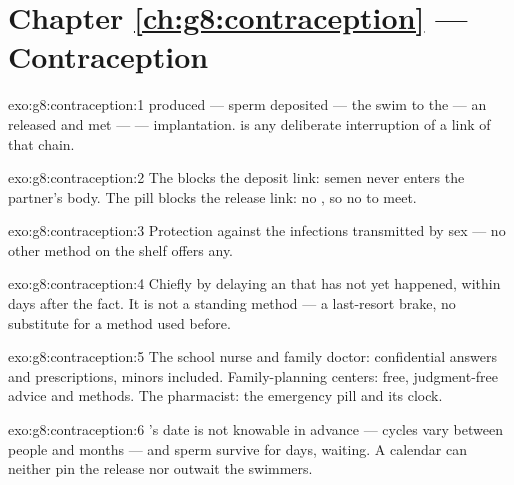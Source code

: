 \section*{Chapter \ref{ch:g8:contraception} --- Contraception}

\begin{solution}{exo:g8:contraception:1}
 produced --- sperm deposited --- the swim to the
 --- an  released and met --- 
--- implantation.  is any deliberate
interruption of a link of that chain.
\end{solution}

\begin{solution}{exo:g8:contraception:2}
The  blocks the deposit link: semen never enters the
partner's body. The pill blocks the release link: no
, so no  to meet.
\end{solution}

\begin{solution}{exo:g8:contraception:3}
Protection against the infections transmitted by sex ---
no other method on the shelf offers any.
\end{solution}

\begin{solution}{exo:g8:contraception:4}
Chiefly by delaying an  that has not yet
happened, within days after the fact. It is not a standing
method --- a last-resort brake, no substitute for a method
used before.
\end{solution}

\begin{solution}{exo:g8:contraception:5}
The school nurse and family doctor: confidential answers
and prescriptions, minors included. Family-planning
centers: free, judgment-free advice and methods. The
pharmacist: the emergency pill and its clock.
\end{solution}

\begin{solution}{exo:g8:contraception:6}
's date is not knowable in advance --- cycles
vary between people and months --- and sperm survive for
days, waiting. A calendar can neither pin the release nor
outwait the swimmers.
\end{solution}

